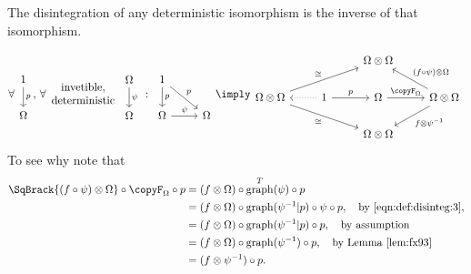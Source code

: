 \documentclass[12pt,oneside,pb-diagram]{article}
\DeclareMathOperator{\graph}{graph}
\begin{document}
\begin{lemma} \label{lem:fx93}
	The disintegration of any deterministic isomorphism is the inverse of that isomorphism.
\end{lemma}

%
\begin{equation} \label{eqn:oijd9}
	\forall \begin{tikzcd} 1 \arrow[d, "p"] \\ \Omega \end{tikzcd} ,\,
	\forall \begin{array}{c} \mbox{invetible}, \\ \mbox{deterministic} \end{array} 
	\begin{tikzcd} \Omega \arrow[d, "\psi"] \\ \Omega \end{tikzcd}
	\,:\,
	\begin{tikzcd} 1 \arrow[d, "p"] \arrow[dr, "p"] \\ \Omega \arrow[r, "\psi"] & \Omega \end{tikzcd}
	\imply
	\begin{tikzcd}
		&& \Omega \otimes \Omega \\
		\Omega \otimes \Omega \arrow[urr, "\cong"] \arrow[drr, "\cong"'] & 1 \arrow[l, dotted] \arrow[r, "p"] & \Omega \arrow[r, "\copyF_{\Omega}"] & \Omega \otimes \Omega \arrow[ul, "(f\circ \psi) \otimes \Omega"'] \arrow[dl, "f\otimes \psi^{-1}"] \\
		& & \Omega \otimes \Omega
	\end{tikzcd}
\end{equation}
%
To see why note that
%
\[\begin{split}
	\SqBrack{ (f\circ \psi) \otimes \Omega } \circ \copyF_{\Omega} \circ p &= (f\otimes \Omega) \circ \graph^T(\psi) \circ p \\
	&= (f\otimes \Omega) \circ \graph(\psi^{-1}|p) \circ \psi \circ p , \quad \mbox{by \eqref{eqn:def:disinteg:3}}, \\
	&= (f\otimes \Omega) \circ \graph(\psi^{-1}|p) \circ p , \quad \mbox{by assumption}  \\
	&= (f\otimes \Omega) \circ \graph(\psi^{-1}) \circ p, \quad \mbox{by Lemma \ref{lem:fx93}} \\
	&= (f\otimes \psi^{-1}) \circ p .
\end{split}\]
%

\end{document}
